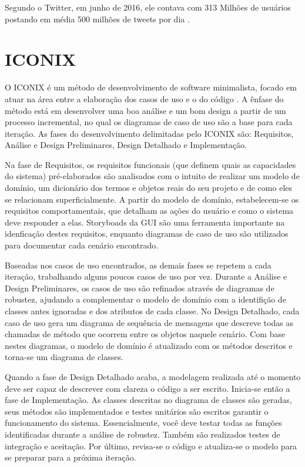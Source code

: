 \documentclass[
	12pt,				%
	openright,			%
	oneside,			%
	a4paper,			%
	english,			%
	spanish,			%
	brazil				%
	]{abntex2}
\begin{document}
	Segundo o Twitter, em junho de 2016, ele contava com 313 Milhões de usuários \cite{twitter_company} postando em média 500 milhões de tweets por dia \cite{TwitterU87:online}.
	
	\section{ICONIX}	
	
	O ICONIX é um método de desenvolvimento de software minimalista, focado em atuar na área entre a elaboração dos casos de uso e o do código \cite{iconix}. A ênfase do método está em desenvolver uma boa análise e um bom design a partir de um processo incremental, no qual os diagramas de caso de uso são a base para cada iteração. As fases do desenvolvimento delimitadas pelo ICONIX são: Requisitos, Análise e Design Preliminares, Design Detalhado e Implementação.
	
	Na fase de Requisitos, os requisitos funcionais (que definem quais as capacidades do sistema) pré-elaborados são analisados com o intuito de realizar um modelo de domínio, um dicionário dos termos e objetos reais do seu projeto e de como eles se relacionam superficialmente. A partir do modelo de domínio, estabelecem-se os requisitos comportamentais, que detalham as ações do usuário e como o sistema deve responder a elas. \cite{iconix} Storyboads da GUI são uma ferramenta importante na idenficação destes requisitos, enquanto diagramas de caso de uso são utilizados para documentar cada cenário encontrado.
	
	Baseadas nos casos de uso encontrados, as demais fases se repetem a cada iteração, trabalhando alguns poucos casos de uso por vez. Durante a Análise e Design Preliminares, os casos de uso são refinados através de diagramas de robustez, ajudando a complementar o modelo de domínio com a identifição de classes antes ignoradas e dos atributos de cada classe. No Design Detalhado, cada caso de uso gera um diagrama de sequência de mensagens que descreve todas as chamadas de método que ocorrem entre os objetos naquele cenário. Com base nestes diagramas, o modelo de domínio é atualizado com os métodos descritos e torna-se um diagrama de classes.
	
	Quando a fase de Design Detalhado acaba, a modelagem realizada até o momento deve ser capaz de descrever com clareza o código a ser escrito. Inicia-se então a fase de Implementação. As classes descritas no diagrama de classes são geradas, seus métodos são implementados e testes unitários são escritos garantir o funcionamento do sistema. Essencialmente, você deve testar todas as funções identificadas durante a análise de robustez. \cite{iconix} Também são realizados testes de integração e aceitação. Por último, revisa-se o código e atualiza-se o modelo para se preparar para a próxima iteração.  
	
\end{document}
